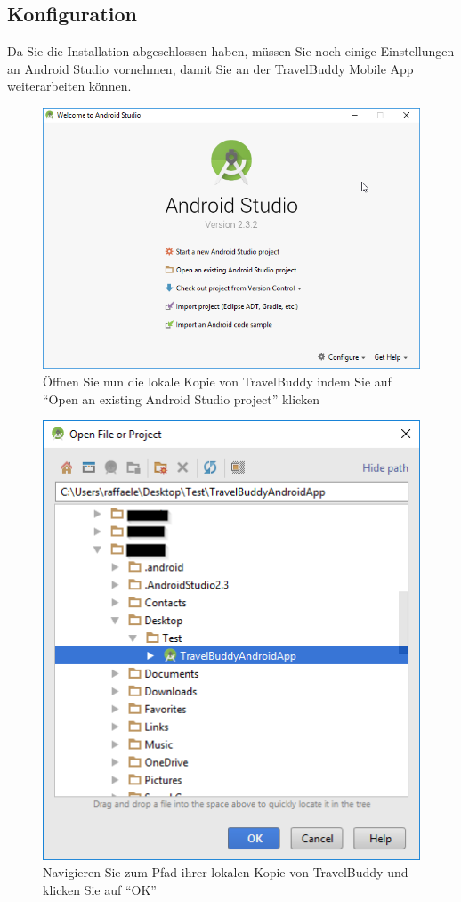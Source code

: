 \documentclass[a4paper,10pt,xetex]{article}
\begin{document}
\subsection{Konfiguration}

Da Sie die Installation abgeschlossen haben, müssen Sie noch einige Einstellungen an Android Studio vornehmen, damit Sie an der TravelBuddy Mobile App weiterarbeiten können.

\begin{figure}
  \centering
  \includegraphics[width=\textwidth]{Installation/2-1}
  \caption{Öffnen Sie nun die lokale Kopie von TravelBuddy indem Sie auf ``Open an existing Android Studio project'' klicken}
\end{figure}

\begin{figure}
  \centering
  \includegraphics[width=\textwidth]{Installation/2-2}
  \caption{Navigieren Sie zum Pfad ihrer lokalen Kopie von TravelBuddy und klicken Sie auf ``OK''}
\end{figure}
\end{document}

